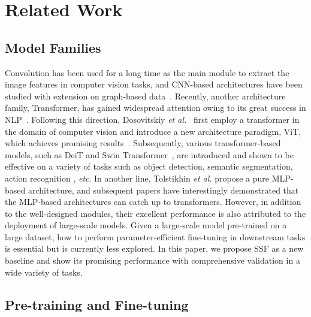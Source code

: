 \section{Related Work}

\subsection{Model Families}

Convolution has been used for a long time as the main module to extract the image features in computer vision tasks, and CNN-based architectures have been studied \cite{simonyan2014very,he2016deep,Xie_2017_CVPR,liu2022convnet,XingyiECCV22,SonghuaECCV22,JingwenECCV22} with extension on graph-based data~\cite{YidingCVPR20,YidingNIPS20,HuihuiAAAI21}. Recently, another architecture family, Transformer, has gained widespread attention owing to its great success in NLP~\cite{vaswani2017attention,devlin2018bert,hu2021lora}. Following this direction, Dosovitskiy \emph{et al.}~\cite{dosovitskiy2020image} first employ a transformer in the domain of computer vision and introduce a new architecture paradigm, ViT, which achieves promising results~\cite{MetaformerCVPR22,SuchengCVPR22}. Subsequently, various transformer-based models, such as DeiT \cite{touvron2020deit} and Swin Transformer~\cite{liu2021swin}, are introduced and shown to be effective on a variety of tasks such as object detection, semantic segmentation, action recognition \cite{liu2021video}, \emph{etc}. In another line, Tolstikhin \emph{et al.} \cite{tolstikhin2021mlp} propose a pure MLP-based architecture, and subsequent papers \cite{hou2021vision,Lian_2021_ASMLP} have interestingly demonstrated that the MLP-based architectures can catch up to transformers. However, in addition to the well-designed modules, their excellent performance is also attributed to the deployment of large-scale models. Given a large-scale model pre-trained on a large dataset, how to perform parameter-efficient fine-tuning in downstream tasks is essential but is currently less explored. In this paper, we propose SSF as a new baseline and show its promising performance with comprehensive validation in a wide variety of tasks. 

\subsection{Pre-training and Fine-tuning}

